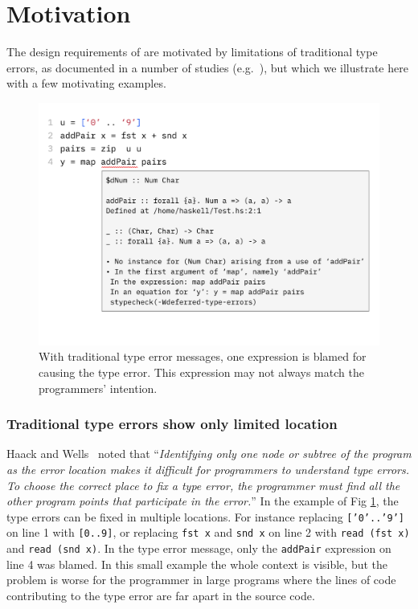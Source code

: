 
\section{Motivation}
The design requirements of \chameleon{} are motivated by limitations of traditional type errors, as documented in a number of studies (e.g.~\cite{yang_improved_2000, hage_solved_2020}), but which we illustrate here with a few motivating examples. 

\begin{figure}
    \centering
    \includegraphics[width=\linewidth,trim=0mm 35mm 0mm 0mm]{images/add-pair-example.pdf}
    \caption{
With traditional type error messages, one expression is blamed for causing the type error. This expression may not always match the programmers' intention. 
    }
    \label{fig:motivation-example}
\end{figure}
\subsubsection{\textbf{Traditional type errors show only limited location}}
Haack and Wells~\cite{haack_type_2004} noted that ``\textit{Identifying only one node or subtree of the program as the error location makes it difficult for programmers to understand type errors. To choose the correct place to fix a type error, the programmer must find all the other program points that participate in the error.}''  In the example of Fig \ref{fig:motivation-example}, the type errors can be fixed in multiple locations. For instance  replacing \texttt{['0'..'9']} on line 1 with \texttt{[0..9]}, or  replacing \texttt{fst x} and \texttt{snd x} on line 2 with \texttt {read (fst x)} and \texttt{read (snd  x)}. In the type error message, only the \texttt{addPair} expression on line 4 was blamed.  In this small example the whole context is visible, but the problem is worse for the programmer in large programs where the lines of code contributing to the type error are far apart in the source code.

